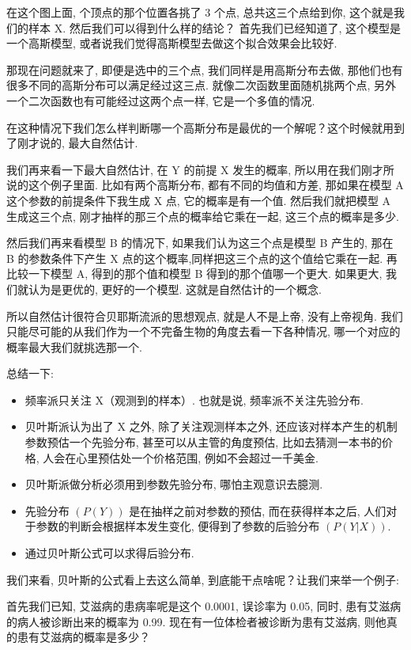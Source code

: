 在这个图上面, 个顶点的那个位置各挑了 3 个点, 总共这三个点给到你, 这个就是我们的样本 X. 然后我们可以得到什么样的结论？
首先我们已经知道了, 这个模型是一个高斯模型, 或者说我们觉得高斯模型去做这个拟合效果会比较好. 

那现在问题就来了, 即便是选中的三个点, 我们同样是用高斯分布去做, 那他们也有很多不同的高斯分布可以满足经过这三点. 就像二次函数里面随机挑两个点, 另外一个二次函数也有可能经过这两个点一样, 它是一个多值的情况. 

在这种情况下我们怎么样判断哪一个高斯分布是最优的一个解呢？这个时候就用到了刚才说的, 最大自然估计. 

我们再来看一下最大自然估计, 在 Y 的前提 X 发生的概率, 所以用在我们刚才所说的这个例子里面. 比如有两个高斯分布, 都有不同的均值和方差, 那如果在模型 A 这个参数的前提条件下我生成 X 点, 它的概率是有一个值. 然后我们就把模型 A 生成这三个点, 刚才抽样的那三个点的概率给它乘在一起, 这三个点的概率是多少. 

然后我们再来看模型 B 的情况下, 如果我们认为这三个点是模型 B 产生的, 那在 B 的参数条件下产生 X 点的这个概率,同样把这三个点的这个值给它乘在一起. 再比较一下模型 A, 得到的那个值和模型 B 得到的那个值哪一个更大. 如果更大, 我们就认为是更优的, 更好的一个模型. 这就是自然估计的一个概念. 

所以自然估计很符合贝耶斯流派的思想观点, 就是人不是上帝, 没有上帝视角. 我们只能尽可能的从我们作为一个不完备生物的角度去看一下各种情况, 哪一个对应的概率最大我们就挑选那一个. 

总结一下: 
\begin{itemize}
  \item 频率派只关注 X（观测到的样本）. 也就是说, 频率派不关注先验分布. 
  \item 贝叶斯派认为出了 X 之外, 除了关注观测样本之外, 还应该对样本产生的机制参数预估一个先验分布, 甚至可以从主管的角度预估, 比如去猜测一本书的价格, 人会在心里预估处一个价格范围, 例如不会超过一千美金. 
  \item 贝叶斯派做分析必须用到参数先验分布, 哪怕主观意识去臆测. 
  \item 先验分布 $(P(Y))$ 是在抽样之前对参数的预估, 而在获得样本之后, 人们对于参数的判断会根据样本发生变化, 便得到了参数的后验分布 $(P(Y|X))$. 
  \item 通过贝叶斯公式可以求得后验分布. 
\end{itemize}

我们来看, 贝叶斯的公式看上去这么简单, 到底能干点啥呢？让我们来举一个例子: 

首先我们已知, 艾滋病的患病率呢是这个 0.0001, 误诊率为 0.05, 同时, 患有艾滋病的病人被诊断出来的概率为 0.99. 现在有一位体检者被诊断为患有艾滋病, 则他真的患有艾滋病的概率是多少？

